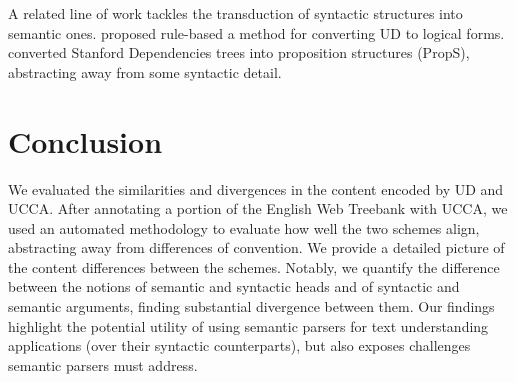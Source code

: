 \documentclass[11pt,a4paper]{article}
\begin{document}
A related line of work tackles the transduction of syntactic structures into semantic ones.
 proposed rule-based a method for converting UD
to logical forms. 
 converted Stanford Dependencies trees into
proposition structures ({\sc PropS}), abstracting away from some syntactic detail.


\section{Conclusion}\label{sec:conclusion}

We evaluated the similarities and divergences in the content encoded by UD and UCCA. 
After annotating a portion of the English Web Treebank with UCCA,
  we used an automated methodology to evaluate how well the two schemes align,
  abstracting away from differences of convention.
We provide a detailed picture of the content differences between the schemes.
Notably, we quantify the difference between the notions of semantic and syntactic heads 
  and of syntactic and semantic arguments, finding substantial divergence between
  them.
Our findings highlight the potential utility of using semantic parsers for text understanding applications
  (over their syntactic counterparts), but also exposes challenges semantic parsers must address.








\end{document}
